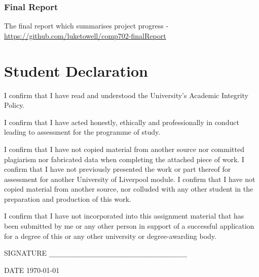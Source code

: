 \documentclass[a4paper,11pt]{report}
\begin{document}
\subsection*{Final Report}
The final report which summarises project progress - \url{https://github.com/luketowell/comp702-finalReport}

\chapter*{\center Student Declaration} 

I confirm that I have read and understood the University's Academic Integrity Policy.

I confirm that I have acted honestly, ethically and professionally in conduct leading
to assessment for the programme of study.  

I confirm that I have not copied material from another source nor committed plagiarism
nor fabricated data when completing the attached piece of work.  I confirm that I have 
not previously presented the work or part thereof for assessment for another University
of Liverpool module.  I confirm that I have not copied material from another source, nor
colluded with any other student in the preparation and production of this work.  

I confirm that I have not incorporated into this assignment material that has been 
submitted by me or any other person in support of a successful application for a 
degree of this or any other university or degree-awarding body.  

\vspace*{1in}

\noindent SIGNATURE \verb!______________________________________!

\noindent DATE \hspace*{.4in}  \today

\vspace*{1in}


\end{document}

